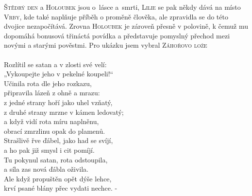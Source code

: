 \documentclass[literature.tex]{subfiles}
\begin{document}
{\textsc{Štědrý den} a \textsc{Holoubek} jsou o~lásce a~smrti,
\textsc{Lilie} se pak někdy dává na místo \textsc{Vrby}, kde také naplňuje příběh o proměně člověka, ale zpravidla se do této dvojice nezapočítává.
Zrovna \textsc{Holoubek} je zároveň přesně v polovině, k čemuž mu dopomáhá bonusová třináctá povídka a představuje pomyslný přechod mezi novými a starými pověstmi.
}{
Pro ukázku jsem vybral \textsc{Záhořovo lože}\\
\vspace*{1pt}\\
Rozlítil se satan a v zlosti své velí: \\
„Vykoupejte jeho v pekelné koupeli!“ \\
Učinila rota dle jeho rozkazu, \\
připravila lázeň z ohně a mrazu: \\
z jedné strany hoří jako uhel vzňatý, \\
z druhé strany mrzne v kámen ledovatý; \\
a když vidí rota míru naplněnu, \\
obrací zmrzlinu opak do plamenů. \\
Strašlivě řve ďábel, jako had se svíjí, \\
a ho pak již smysl i cit pomíjí. \\
Tu pokynul satan, rota odstoupila, \\
a síla zas nová ďábla oživila. \\
Ale když propuštěn opět dýše lehce, \\
krví psané blány přec vydati nechce. -
}
\end{document}

